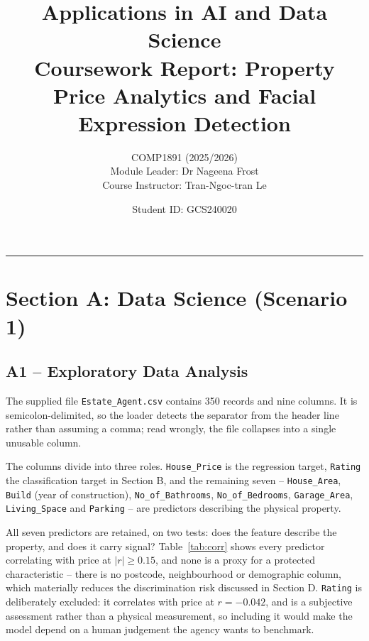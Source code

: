 \documentclass[11pt,a4paper]{article}
\title{\vspace{-1.5cm}\textbf{Applications in AI and Data Science}\\[0.3em]
\large Coursework Report: Property Price Analytics and Facial Expression Detection}
\author{COMP1891 (2025/2026)\\[0.2em]
\small Module Leader: Dr Nageena Frost\\[0.15em]
\small Course Instructor: Tran-Ngoc-tran Le}
\date{Student ID: GCS240020}
\begin{document}
\maketitle

\begin{center}
\end{center}

\vspace{0.6em}
\tableofcontents
\vspace{0.5em}
\hrule

\section{Section A: Data Science (Scenario 1)}

\subsection{A1 -- Exploratory Data Analysis}

The supplied file \texttt{Estate\_Agent.csv} contains 350 records and nine columns. It is
semicolon-delimited, so the loader detects the separator from the header line rather than
assuming a comma; read wrongly, the file collapses into a single unusable column.

The columns divide into three roles. \texttt{House\_Price} is the regression target,
\texttt{Rating} the classification target in Section B, and the remaining seven --
\texttt{House\_Area}, \texttt{Build} (year of construction), \texttt{No\_of\_Bathrooms},
\texttt{No\_of\_Bedrooms}, \texttt{Garage\_Area}, \texttt{Living\_Space} and
\texttt{Parking} -- are predictors describing the physical property.

All seven predictors are retained, on two tests: does the feature describe the property, and
does it carry signal? Table~\ref{tab:corr} shows every predictor correlating with price at
$|r| \geq 0.15$, and none is a proxy for a protected characteristic -- there is no postcode,
neighbourhood or demographic column, which materially reduces the discrimination risk
discussed in Section D. \texttt{Rating} is deliberately excluded: it correlates with price at
$r = -0.042$, and is a subjective assessment rather than a physical measurement, so including
it would make the model depend on a human judgement the agency wants to benchmark.
\end{document}
